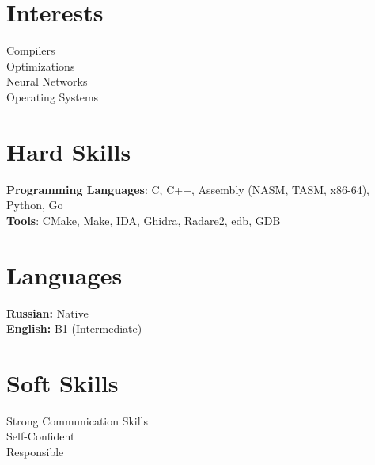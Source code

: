 \documentclass[A4,11pt]{article}
\begin{document}
\section{Interests}
 \begin{itemize}[leftmargin=0.5cm, label={}]
    \small{\item{
     {Compilers}\\
     {Optimizations}\\
     {Neural Networks}\\
     {Operating Systems}
    }}
 \end{itemize}

\section{Hard Skills}
 \begin{itemize}[leftmargin=0.5cm, label={}]
    \small{\item{
     \textbf{Programming Languages}{: C, C++, Assembly (NASM, TASM, x86-64), Python, Go} \\
     \textbf{Tools}{: CMake, Make, IDA, Ghidra, Radare2, edb, GDB}
    }}
 \end{itemize}

\section{Languages}
 \begin{itemize}[leftmargin=0.5cm, label={}]
    \small{\item{
\textbf{Russian:} Native \\
\textbf{English:} B1 (Intermediate)
    }}
 \end{itemize}

\section{Soft Skills}
 \begin{itemize}[leftmargin=0.5cm, label={}]
    \small{\item{
     {Strong Communication Skills}\\
     {Self-Confident}\\
     {Responsible}
    }}
 \end{itemize}
\end{document}
